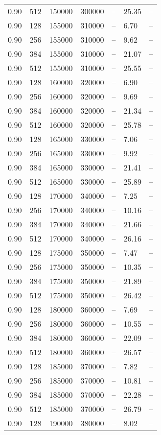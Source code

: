 \begin{tabular}{l|l|l|l|l|l|l}
0.90 & 512 & 150000 & 300000 & -- & 25.35 & --\\
0.90 & 128 & 155000 & 310000 & -- &  6.70 & --\\
0.90 & 256 & 155000 & 310000 & -- &  9.62 & --\\
0.90 & 384 & 155000 & 310000 & -- & 21.07 & --\\
0.90 & 512 & 155000 & 310000 & -- & 25.55 & --\\
0.90 & 128 & 160000 & 320000 & -- &  6.90 & --\\
0.90 & 256 & 160000 & 320000 & -- &  9.69 & --\\
0.90 & 384 & 160000 & 320000 & -- & 21.34 & --\\
0.90 & 512 & 160000 & 320000 & -- & 25.78 & --\\
0.90 & 128 & 165000 & 330000 & -- &  7.06 & --\\
0.90 & 256 & 165000 & 330000 & -- &  9.92 & --\\
0.90 & 384 & 165000 & 330000 & -- & 21.41 & --\\
0.90 & 512 & 165000 & 330000 & -- & 25.89 & --\\
0.90 & 128 & 170000 & 340000 & -- &  7.25 & --\\
0.90 & 256 & 170000 & 340000 & -- & 10.16 & --\\
0.90 & 384 & 170000 & 340000 & -- & 21.66 & --\\
0.90 & 512 & 170000 & 340000 & -- & 26.16 & --\\
0.90 & 128 & 175000 & 350000 & -- &  7.47 & --\\
0.90 & 256 & 175000 & 350000 & -- & 10.35 & --\\
0.90 & 384 & 175000 & 350000 & -- & 21.89 & --\\
0.90 & 512 & 175000 & 350000 & -- & 26.42 & --\\
0.90 & 128 & 180000 & 360000 & -- &  7.69 & --\\
0.90 & 256 & 180000 & 360000 & -- & 10.55 & --\\
0.90 & 384 & 180000 & 360000 & -- & 22.09 & --\\
0.90 & 512 & 180000 & 360000 & -- & 26.57 & --\\
0.90 & 128 & 185000 & 370000 & -- &  7.82 & --\\
0.90 & 256 & 185000 & 370000 & -- & 10.81 & --\\
0.90 & 384 & 185000 & 370000 & -- & 22.28 & --\\
0.90 & 512 & 185000 & 370000 & -- & 26.79 & --\\
0.90 & 128 & 190000 & 380000 & -- &  8.02 & --\\

\end{tabular}
